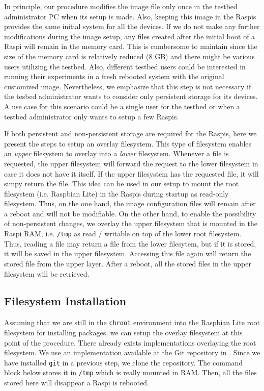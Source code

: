 \label{sec:overlay_fs}
In principle, our procedure modifies the image file only once in
the testbed administrator \ac{PC} when its setup is made. Also, keeping
this image in the \ac{Raspi}s provides the same initial system for all
the devices. If we do not make any further modifications during
the image setup, any files created after the initial boot of a \ac{Raspi}
will remain in the memory card. This is cumbersome to maintain since
the size of the memory card is relatively reduced (8 GB) and there
might be various users utilizing the testbed. Also, different testbed
users could be interested in running their experiments in a fresh
rebooted system with the original customized image. Nevertheless, we
emphasize that this step is not necessary if the tesbed administrator
wants to consider only persistent storage for its devices. A use case
for this scenario could be a single user for the testbed or when a testbed
administrator only wants to setup a few \ac{Raspi}s.

If both persistent and non-persistent storage are required for
the \ac{Raspi}s, here we present the steps to setup an overlay filesystem.
This type of filesystem enables an \textit{upper} filesystem to overlay
into a \textit{lower} filesystem. Whenever a file is requested, the upper
filesystem will forward the request to the lower filesystem in case it
does not have it itself. If the upper filesystem has the requested file,
it will simpy return the file. This idea can be used in our setup to mount
the root filesystem (i.e. Raspbian Lite) in the \ac{Raspi}s during startup
as read-only filesystem. Thus, on the one hand, the image configuration files
will remain after a reboot and will not be modifiable. On the other hand,
to enable the possibility of non-persistent changes, we overlay the upper
filesystem that is mounted in the \ac{Raspi} \ac{RAM}, i.e. \texttt{/tmp}
as read / writable on top of the lower root filesystem. Thus, reading a file
may return a file from the lower filesytem, but if it is stored, it will
be saved in the upper filesystem. Accessing this file again will return
the stored file from the upper layer. After a reboot, all the stored files
in the upper filesystem will be retrieved.

\subsection{Filesystem Installation}

Assuming that we are still in the \texttt{chroot} environment into the
Raspbian Lite root filesystem for installing packages, we can setup the
overlay filesystem at this point of the procedure. There already exists
implementations overlaying the root filesystem. We use an implementation
available at the Git repository in \cite{overlayroot}. Since we have
installed \texttt{git} in a previous step, we clone the repository. The
command block below stores it in \texttt{/tmp} which is really mounted in
\ac{RAM}. Then, all the files stored here will disappear a \ac{Raspi} is
rebooted.


